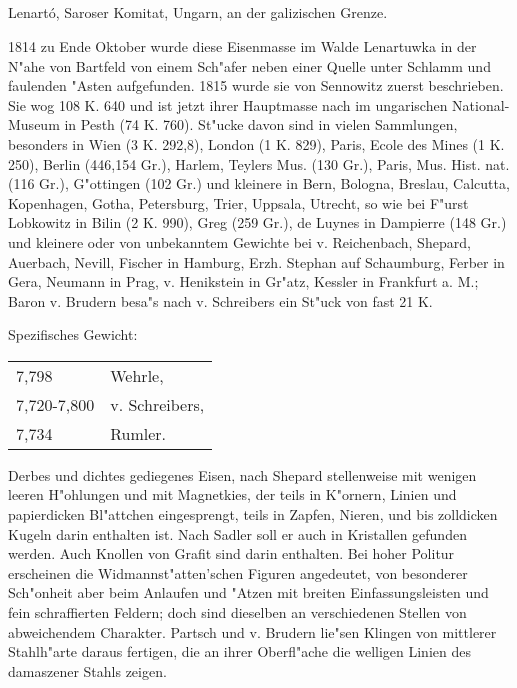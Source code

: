 \documentclass[a4paper, 11pt, oneside]{article}
\begin{document}
\subsection{}
\LARGE
\paragraph{}
Lenartó, Saroser Komitat, Ungarn, an der galizischen Grenze.

1814 zu Ende Oktober wurde diese Eisenmasse im Walde Lenartuwka in der N"ahe von Bartfeld von einem Sch"afer neben einer Quelle unter Schlamm und faulenden "Asten aufgefunden. 1815 wurde sie von Sennowitz zuerst beschrieben. Sie wog 108 K. 640 und ist jetzt ihrer Hauptmasse nach im ungarischen National-Museum in Pesth (74 K. 760). St"ucke davon sind in vielen Sammlungen, besonders in Wien (3 K. 292,8), London (1 K. 829), Paris, Ecole des Mines (1 K. 250), Berlin (446,154 Gr.), Harlem, Teylers Mus. (130 Gr.), Paris, Mus. Hist. nat. (116 Gr.), G"ottingen (102 Gr.) und kleinere in Bern, Bologna, Breslau, Calcutta, Kopenhagen, Gotha, Petersburg, Trier, Uppsala, Utrecht, so wie bei F"urst Lobkowitz in Bilin (2 K. 990), Greg (259 Gr.), de Luynes in Dampierre (148 Gr.) und kleinere oder von unbekanntem Gewichte bei v. Reichenbach, Shepard, Auerbach, Nevill, Fischer in Hamburg, Erzh. Stephan auf Schaumburg, Ferber in Gera, Neumann in Prag, v. Henikstein in Gr"atz, Kessler in Frankfurt a. M.; Baron v. Brudern besa"s nach v. Schreibers ein St"uck von fast 21 K.

Spezifisches Gewicht:  
\begin{table}[!ht]
    \centering\swabfamily\Large
    \begin{tabular}{l l}
        7,798 & Wehrle,\\
        7,720-7,800 & v. Schreibers,\\
        7,734 & Rumler.
    \end{tabular}
\end{table}

Derbes und dichtes gediegenes Eisen, nach Shepard stellenweise mit wenigen leeren H"ohlungen und mit Magnetkies, der teils in K"ornern, Linien und papierdicken Bl"attchen eingesprengt, teils in Zapfen, Nieren, und bis zolldicken Kugeln darin enthalten ist. Nach Sadler soll er auch in Kristallen gefunden werden. Auch Knollen von Grafit sind darin enthalten. Bei hoher Politur erscheinen die Widmannst"atten'schen Figuren angedeutet, von besonderer Sch"onheit aber beim Anlaufen und "Atzen mit breiten Einfassungsleisten und fein schraffierten Feldern; doch sind dieselben an verschiedenen Stellen von abweichendem Charakter. Partsch und v. Brudern lie"sen Klingen von mittlerer Stahlh"arte daraus fertigen, die an ihrer Oberfl"ache die welligen Linien des damaszener Stahls zeigen.
\end{document}
